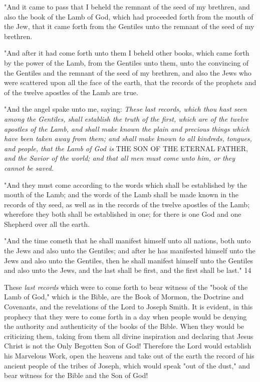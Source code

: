 "And it came to pass that I beheld the remnant of the seed of my brethren, and also the book
of the Lamb of God, which had proceeded forth from the mouth of the Jew, that it came forth
from the Gentiles unto the remnant of the seed of my brethren.

"And after it had come forth unto them I beheld other books, which came forth by the power
of the Lamb, from the Gentiles unto them, unto the convincing of the Gentiles and the
remnant of the seed of my brethren, and also the Jews who were scattered upon all the face of
the earth, that the records of the prophets and of the twelve apostles of the Lamb are true.

"And the angel spake unto me, saying: \textit{These last records, which thou hast seen among the
Gentiles, shall establish the truth of the first, which are of the twelve apostles of the Lamb,
and shall make known the plain and precious things which have been taken away from them;
and shall make known to all kindreds, tongues, and people, that the Lamb of God is} THE
SON OF THE ETERNAL FATHER, \textit{and the Savior of the world; and that all men must
come unto him, or they cannot be saved.}

"And they must come according to the words which shall be established by the mouth of the
Lamb; and the words of the Lamb shall be made known in the records of thy seed, as well as
in the records of the twelve apostles of the Lamb; wherefore they both shall be established in
one; for there is one God and one Shepherd over all the earth.

"And the time cometh that he shall manifest himself unto all nations, both unto the Jews and
also unto the Gentiles; and after he has manifested himself unto the Jews and also unto the
Gentiles, then he shall manifest himself unto the Gentiles and also unto the Jews, and the last
shall be first, and the first shall be last." 14

These \textit{last records} which were to come forth to bear witness of the "book of the Lamb of
God," which is the Bible, are the Book of Mormon, the Doctrine and Covenants, and the
revelations of the Lord to Joseph Smith. It is evident, in this prophecy that they were to come
forth in a day when people would be denying the authority and authenticity of the books of
the Bible. When they would be criticizing them, taking from them all divine inspiration and
declaring that Jesus Christ is not the Only Begotten Son of God! Therefore the Lord would
establish his Marvelous Work, open the heavens and take out of the earth the record of his
ancient people of the tribes of Joseph, which would speak "out of the dust," and bear witness
for the Bible and the Son of God!


